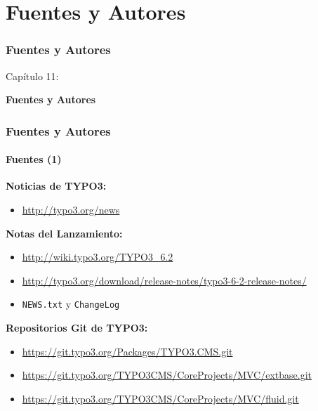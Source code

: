 %

\section{Fuentes y Autores}
\begin{frame}[fragile]
	\frametitle{Fuentes y Autores}

	\begin{center}\huge{Capítulo 11:}\end{center}
	\begin{center}\huge{\color{typo3darkgrey}\textbf{Fuentes y Autores}}\end{center}

\end{frame}


\begin{frame}[fragile]
	\frametitle{Fuentes y Autores}
	\framesubtitle{Fuentes (1)}

	\textbf{Noticias de TYPO3:}
		\begin{itemize}\smaller
			\item \url{http://typo3.org/news}
		\end{itemize}

	\textbf{Notas del Lanzamiento:}
		\begin{itemize}\smaller
			\item \url{http://wiki.typo3.org/TYPO3_6.2}
			\item \url{http://typo3.org/download/release-notes/typo3-6-2-release-notes/}
			\item \texttt{NEWS.txt} y \texttt{ChangeLog}
		\end{itemize}

	\textbf{Repositorios Git de TYPO3:}
		\begin{itemize}\smaller
			\item \url{https://git.typo3.org/Packages/TYPO3.CMS.git}
			\item \url{https://git.typo3.org/TYPO3CMS/CoreProjects/MVC/extbase.git}
			\item \url{https://git.typo3.org/TYPO3CMS/CoreProjects/MVC/fluid.git}
		\end{itemize}

\end{frame}

